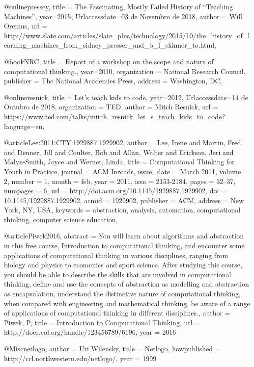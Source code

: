 @online{pressey,
	title = {The Fascinating, Mostly Failed History of “Teaching Machines”},
	year={2015},
	Urlaccessdate={03 de Novembro de 2018},
	author = {Will Oremus},
	url = {http://www.slate.com/articles/slate_plus/technology/2015/10/the_history_of_learning_machines_from_sidney_presser_and_b_f_skinner_to.html},
}

@book{NRC,
	title = {Report of a workshop on the scope and nature of computational thinking.},
	year={2010},
	organization = {National Research Council},
	publisher = {The National Academies Press},
	address = {Washington, DC},
}

@online{resnick,
	title = {Let's teach kids to code},
	year={2012},
	Urlaccessdate={14 de Outubro de 2018},
	organization = {TED},
	author = {Mitch Resnick},
	url = {https://www.ted.com/talks/mitch_resnick_let_s_teach_kids_to_code?language=en},
}

@article{Lee:2011:CTY:1929887.1929902,
 author = {Lee, Irene and Martin, Fred and Denner, Jill and Coulter, Bob and Allan, Walter and Erickson, Jeri and Malyn-Smith, Joyce and Werner, Linda},
 title = {Computational Thinking for Youth in Practice},
 journal = {ACM Inroads},
 issue_date = {March 2011},
 volume = {2},
 number = {1},
 month = feb,
 year = {2011},
 issn = {2153-2184},
 pages = {32--37},
 numpages = {6},
 url = {http://doi.acm.org/10.1145/1929887.1929902},
 doi = {10.1145/1929887.1929902},
 acmid = {1929902},
 publisher = {ACM},
 address = {New York, NY, USA},
 keywords = {abstraction, analysis, automation, computational thinking, computer science education},
} 



@article{Piwek2016,
abstract = {You will learn about algorithms and abstraction in this free course, Introduction to computational thinking, and encounter some applications of computational thinking in various disciplines, ranging from biology and physics to economics and sport science. After studying this course, you should be able to describe the skills that are involved in computational thinking, define and use the concepts of abstraction as modelling and abstraction as encapsulation, understand the distinctive nature of computational thinking, when compared with engineering and mathematical thinking, be aware of a range of applications of computational thinking in different disciplines.},
author = {Piwek, P},
title = {{Introduction to Computational Thinking}},
url = {http://doer.col.org/handle/123456789/6196},
year = {2016}
}

@Misc{netlogo,
author =   {Uri Wilensky},
title =    {Netlogo},
howpublished = {http://ccl.northwestern.edu/netlogo/},
year = {1999}
}

